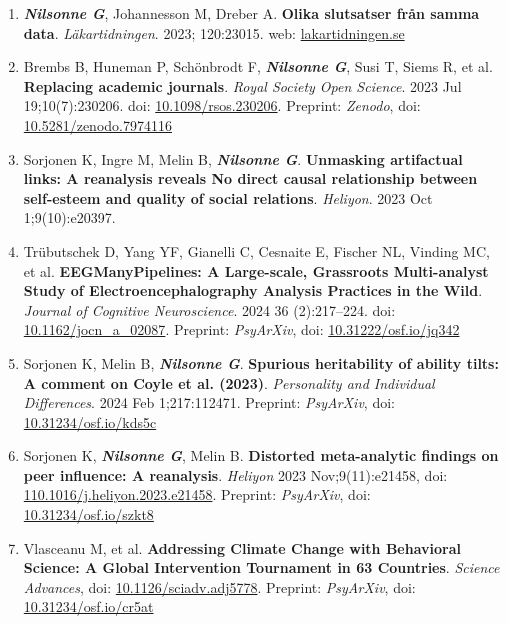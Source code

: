 \documentclass[10pt]{article}
\begin{document}
\begin{enumerate}[nolistsep]
\item \textbf{\textit{Nilsonne G}}, Johannesson M, Dreber A. \textbf{Olika slutsatser från samma data}. \emph{Läkartidningen}. 2023; 120:23015. web: \href{https://lakartidningen.se/klinik-och-vetenskap-1/artiklar-1/temaartikel/2023/05/olika-slutsatser-fran-samma-data/}{lakartidningen.se}
\item Brembs B, Huneman P, Schönbrodt F, \textbf{\textit{Nilsonne G}}, Susi T, Siems R, et al. \textbf{Replacing academic journals}. \emph{Royal Society Open Science}. 2023 Jul 19;10(7):230206. doi: \href{https://doi.org/10.1098/rsos.230206}{10.1098/rsos.230206}. Preprint: \emph{Zenodo}, doi: \href{https://doi.org/10.5281/zenodo.7974116}{10.5281/zenodo.7974116}
\item Sorjonen K, Ingre M, Melin B, \textbf{\textit{Nilsonne G}}. \textbf{Unmasking artifactual links: A reanalysis reveals No direct causal relationship between self-esteem and quality of social relations}. \emph{Heliyon}. 2023 Oct 1;9(10):e20397. 
\item Trübutschek D, Yang YF, Gianelli C, Cesnaite E, Fischer NL, Vinding MC, et al. \textbf{EEGManyPipelines: A Large-scale, Grassroots Multi-analyst Study of Electroencephalography Analysis Practices in the Wild}. \emph{Journal of Cognitive Neuroscience}. 2024 36 (2):217–224. doi: \href{https://doi.org/10.1162/jocn\_a\_02087}{10.1162/jocn\_a\_02087}. Preprint: \emph{PsyArXiv}, doi: \href{https://doi.org/10.31222/osf.io/jq342}{10.31222/osf.io/jq342}
\item Sorjonen K, Melin B, \textbf{\textit{Nilsonne G}}. \textbf{Spurious heritability of ability tilts: A comment on Coyle et al. (2023)}. \emph{Personality and Individual Differences}. 2024 Feb 1;217:112471. 
Preprint: \emph{PsyArXiv}, doi: \href{https://doi.org/10.31234/osf.io/kds5c}{10.31234/osf.io/kds5c}
\item Sorjonen K, \textbf{\textit{Nilsonne G}}, Melin B. \textbf{Distorted meta-analytic findings on peer influence: A reanalysis}. \emph{Heliyon} 2023 Nov;9(11):e21458, doi: \href{https://doi.org/10.1016/j.heliyon.2023.e21458}{110.1016/j.heliyon.2023.e21458}.
Preprint: \emph{PsyArXiv}, doi: \href{https://doi.org/10.31234/osf.io/szkt8}{10.31234/osf.io/szkt8}
\item Vlasceanu M, et al. \textbf{Addressing Climate Change with Behavioral Science: A Global Intervention Tournament in 63 Countries}. \emph{Science Advances}, doi: \href{https://doi.org/10.1126/sciadv.adj5778}{10.1126/sciadv.adj5778}. Preprint: \emph{PsyArXiv}, doi: \href{https://doi.org/10.31234/osf.io/cr5at}{10.31234/osf.io/cr5at}

\end{enumerate}
\end{document}
